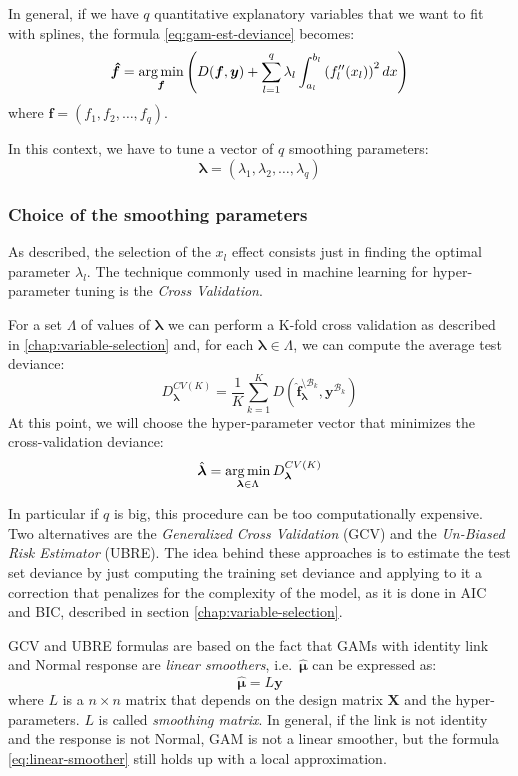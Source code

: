\documentclass[a4paper, nobind]{templates/ociamthesis}
\theoremstyle{definition}
\theoremstyle{definition}
\theoremstyle{definition}
\theoremstyle{remark}
\begin{document}
In general, if we have \(q\) quantitative explanatory variables that we want to fit with splines, the formula \eqref{eq:gam-est-deviance} becomes:
\begin{equation}
\label{eq:gam-est-deviance-multi}
\boldsymbol{\hat{f}} = \operatorname*{arg\,min}_{\boldsymbol{f}}
{\left(
  D(\boldsymbol{f}, \boldsymbol{y})
    + \sum_{l=1}^{q}{
      \lambda_l \int_{a_l}^{b_l}{\left( f_l''(x_l) \right)^2 dx}
    }
\right)} 
\end{equation}
where \(\boldsymbol{f} = \left( f_1, f_2,\dots,f_q \right)\).

In this context, we have to tune a vector of \(q\) smoothing parameters:
\[\boldsymbol{\lambda} = \left( \lambda_1, \lambda_2, \dots, \lambda_q \right)\]

\hypertarget{chap:gam-choice-lambda}{%
\subsubsection{Choice of the smoothing parameters}\label{chap:gam-choice-lambda}}

As described, the selection of the \(x_l\) effect consists just in finding the optimal parameter \(\lambda_l\). The technique commonly used in machine learning for hyper-parameter tuning is the \emph{Cross Validation}.

For a set \(\Lambda\) of values of \(\boldsymbol{\lambda}\) we can perform a K-fold cross validation as described in \ref{chap:variable-selection} and, for each \(\boldsymbol{\lambda}\in\Lambda\), we can compute the average test deviance:
\[
D^{CV(K)}_{\boldsymbol{\lambda}} =
\frac{1}{K} \sum_{k=1}^{K}{
D\left(
\boldsymbol{\hat{f}}_{\boldsymbol{\lambda}}^{\setminus \mathcal{B}_k}, \boldsymbol{y}^{\mathcal{B}_k}
\right)
}
\]
At this point, we will choose the hyper-parameter vector that minimizes the cross-validation deviance:
\[
\hat{\boldsymbol{\lambda}} = \operatorname*{arg\,min}_{\boldsymbol{\lambda}\in\Lambda}{D^{CV(K)}_{\boldsymbol{\lambda}}}
\]

In particular if \(q\) is big, this procedure can be too computationally expensive. Two alternatives are the \emph{Generalized Cross Validation} (GCV) and the \emph{Un-Biased Risk Estimator} (UBRE). The idea behind these approaches is to estimate the test set deviance by just computing the training set deviance and applying to it a correction that penalizes for the complexity of the model, as it is done in AIC and BIC, described in section \ref{chap:variable-selection}.

GCV and UBRE formulas are based on the fact that GAMs with identity link and Normal response are \emph{linear smoothers}, i.e.~\(\boldsymbol{\hat{\mu}}\) can be expressed as:
\begin{equation}
\label{eq:linear-smoother}
\boldsymbol{\hat{\mu}} = L \boldsymbol{y}
\end{equation}
where \(L\) is a \(n\times n\) matrix that depends on the design matrix \(\boldsymbol{X}\) and the hyper-parameters. \(L\) is called \emph{smoothing matrix}. In general, if the link is not identity and the response is not Normal, GAM is not a linear smoother, but the formula \eqref{eq:linear-smoother} still holds up with a local approximation.
\end{document}
